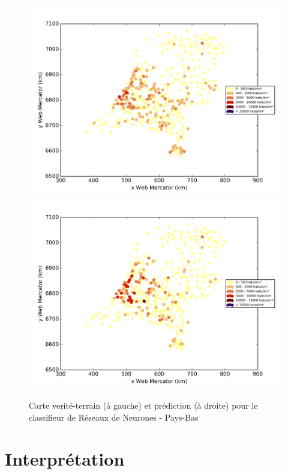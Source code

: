 \documentclass{book}
\begin{document}
\begin{figure}[H]
\centerline{
\includegraphics[scale=0.5]{../../data/Pays-Bas/test/Neural_Network_Classification-oversampling/Neural_Network_Classification-oversampling/density_ground_truth.png}
\includegraphics[scale=0.5]{../../data/Pays-Bas/test/Neural_Network_Classification-oversampling/Neural_Network_Classification-oversampling/density_classification.png}
}
\caption{Carte verité-terrain (à gauche) et prédiction (à droite) pour le classifieur de Réseaux de Neurones - Pays-Bas}
\label{nn_carte_pays-bas}
\end{figure}

\section{Interprétation}
\end{document}
